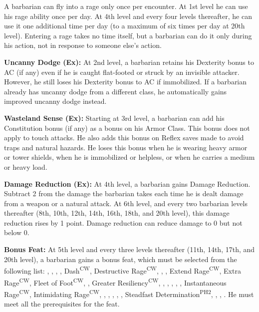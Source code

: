 A barbarian can fly into a rage only once per encounter. At 1st level he can use his rage ability once per day. At 4th level and every four levels thereafter, he can use it one additional time per day (to a maximum of six times per day at 20th level). Entering a rage takes no time itself, but a barbarian can do it only during his action, not in response to someone else's action. 

\textbf{Uncanny Dodge (Ex):} At 2nd level, a barbarian retains his Dexterity bonus to AC (if any) even if he is caught flat-footed or struck by an invisible attacker. However, he still loses his Dexterity bonus to AC if immobilized. If a barbarian already has uncanny dodge from a different class, he automatically gains improved uncanny dodge instead.

\textbf{Wasteland Sense (Ex):} Starting at 3rd level, a barbarian can add his Constitution bonus (if any) as a bonus on his Armor Class. This bonus does not apply to touch attacks. He also adds this bonus on Reflex saves made to avoid traps and natural hazards. He loses this bonus when he is wearing heavy armor or tower shields, when he is immobilized or helpless, or when he carries a medium or heavy load.

\textbf{Damage Reduction (Ex):} At 4th level, a barbarian gains Damage Reduction. Subtract 2 from the damage the barbarian takes each time he is dealt damage from a weapon or a natural attack. At 6th level, and every two barbarian levels thereafter (8th, 10th, 12th, 14th, 16th, 18th, and 20th level), this damage reduction rises by 1 point. Damage reduction can reduce damage to 0 but not below 0.


\textbf{Bonus Feat:} At 5th level and every three levels thereafter (11th, 14th, 17th, and 20th level), a barbarian gains a bonus feat, which must be selected from the following list:
,
,
,
,
Dash\textsuperscript{CW},
Destructive Rage\textsuperscript{CW},
,
,
Extend Rage\textsuperscript{CW},
Extra Rage\textsuperscript{CW},
Fleet of Foot\textsuperscript{CW},
,
Greater Resiliency\textsuperscript{CW},
,
,
,
,
,
Instantaneous Rage\textsuperscript{CW},
Intimidating Rage\textsuperscript{CW},
,
,
,
,
,
Steadfast Determination\textsuperscript{PH2},
,
,
.
He must meet all the prerequisites for the feat.

